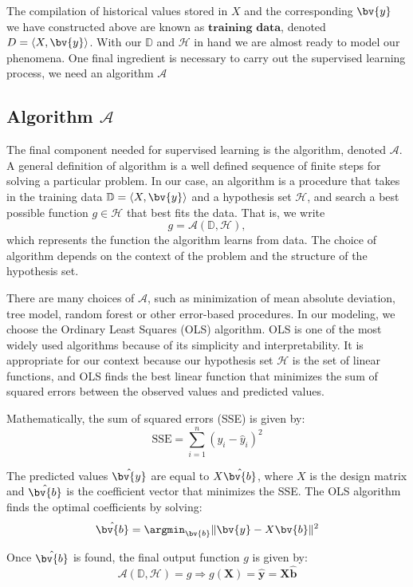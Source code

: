 \documentclass[12pt]{article}
\begin{document}
The compilation of historical values stored in $X$ and the corresponding $\bv{y}$ we have constructed above are known as $\textbf{training data}$, denoted $D = \langle X,\bv{y} \rangle$. With our $\mathbb{D}$ and $\mathcal{H}$ in hand we are almost ready to model our phenomena. One final ingredient is necessary to carry out the supervised learning process, we need an algorithm $\mathcal{A}$




\subsection{Algorithm $\mathcal{A}$}

The final component needed for supervised learning is the algorithm, denoted \( \mathcal{A} \). A general definition of algorithm is a well defined sequence of finite steps for solving a particular problem. In our case, an algorithm is a procedure that takes in the training data \( \mathbb{D} = \langle X, \bv{y} \rangle \) and a hypothesis set \( \mathcal{H} \), and search a best possible function \( g \in \mathcal{H} \) that best fits the data. That is, we write
\[
g = \mathcal{A}(\mathbb{D}, \mathcal{H}),
\]
which represents the function the algorithm learns from data. The choice of algorithm depends on the context of the problem and the structure of the hypothesis set. 


There are many choices of \( \mathcal{A} \), such as minimization of mean absolute deviation, tree model, random forest or other error-based procedures. In our modeling, we choose the Ordinary Least Squares (OLS) algorithm. OLS is one of the most widely used algorithms because of its simplicity and interpretability. It is appropriate for our context because our hypothesis set \( \mathcal{H} \) is the set of linear functions, and OLS finds the best linear function that minimizes the sum of squared errors between the observed values and predicted values.

Mathematically, the sum of squared errors (SSE) is given by:
\[
\text{SSE} = \sum_{i=1}^n (y_i - \hat{y}_i)^2
\]

The predicted values \( \hat{\bv{y}} \) are equal to \( X\hat{\bv{b}} \), where \( X \) is the design matrix and \( \hat{\bv{b}} \) is the coefficient vector that minimizes the SSE. The OLS algorithm finds the optimal coefficients by solving:
\[
\hat{\bv{b}} = \argmin_{\bv{b}} \| \bv{y} - X\bv{b} \|^2
\]

Once \( \hat{\bv{b}} \) is found, the final output function \( g \) is given by:
\[
\mathcal{A}(\mathbb{D}, \mathcal{H}) = g \Rightarrow g(\mathbf{X}) = \hat{\mathbf{y}} = \mathbf{X}\hat{\mathbf{b}}
\]
\end{document}
